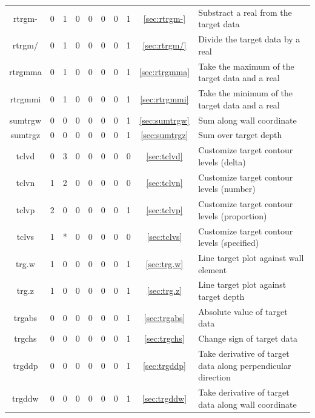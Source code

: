 \documentclass[a4paper,10pt]{report}
\begin{document}
\begin{center}
\begin{longtable}{|c|c|c|c|c|c|c|c|c|l|}
    rtrgm- \index{b2plot, rtrgm-}   & 0 & 1 & 0 & 0 & 0 & 0 & 1 & \ref{sec:rtrgm-}   & Substract a real from the target data \\
    rtrgm/ \index{b2plot, rtrgm/}   & 0 & 1 & 0 & 0 & 0 & 0 & 1 & \ref{sec:rtrgm/}   & Divide the target data by a real \\
    rtrgmma \index{b2plot, rtrgmma}  & 0 & 1 & 0 & 0 & 0 & 0 & 1 & \ref{sec:rtrgmma}  & Take the maximum of the target data and a real \\
    rtrgmmi \index{b2plot, rtrgmmi}  & 0 & 1 & 0 & 0 & 0 & 0 & 1 & \ref{sec:rtrgmmi}  & Take the minimum of the target data and a real \\
    sumtrgw \index{b2plot, sumtrgw}  & 0 & 0 & 0 & 0 & 0 & 0 & 1 & \ref{sec:sumtrgw}  & Sum along wall coordinate \\
    sumtrgz \index{b2plot, sumtrgz}  & 0 & 0 & 0 & 0 & 0 & 0 & 1 & \ref{sec:sumtrgz}  & Sum over target depth \\
    tclvd \index{b2plot, tclvd}    & 0 & 3 & 0 & 0 & 0 & 0 & 0 & \ref{sec:tclvd}    & Customize target contour levels (delta) \\
    tclvn \index{b2plot, tclvn}    & 1 & 2 & 0 & 0 & 0 & 0 & 0 & \ref{sec:tclvn}    & Customize target contour levels (number) \\
    tclvp \index{b2plot, tclvp}    & 2 & 0 & 0 & 0 & 0 & 0 & 1 & \ref{sec:tclvp}    & Customize target contour levels (proportion) \\
    tclvs \index{b2plot, tclvs}    & 1 & * & 0 & 0 & 0 & 0 & 0 & \ref{sec:tclvs}    & Customize target contour levels (specified) \\
    trg.w \index{b2plot, trg.w}    & 1 & 0 & 0 & 0 & 0 & 0 & 1 & \ref{sec:trg.w}    & Line target plot against wall element \\
    trg.z \index{b2plot, trg.z}    & 1 & 0 & 0 & 0 & 0 & 0 & 1 & \ref{sec:trg.z}    & Line target plot against target depth \\
    trgabs \index{b2plot, trgabs}   & 0 & 0 & 0 & 0 & 0 & 0 & 1 & \ref{sec:trgabs}   & Absolute value of target data \\
    trgchs \index{b2plot, trgchs}   & 0 & 0 & 0 & 0 & 0 & 0 & 1 & \ref{sec:trgchs}   & Change sign of target data \\
    trgddp \index{b2plot, trgddp}   & 0 & 0 & 0 & 0 & 0 & 0 & 1 & \ref{sec:trgddp}   & Take derivative of target data along perpendicular direction \\
    trgddw \index{b2plot, trgddw}   & 0 & 0 & 0 & 0 & 0 & 0 & 1 & \ref{sec:trgddw}   & Take derivative of target data along wall coordinate \\

\end{longtable}
\end{center}
\end{document}
